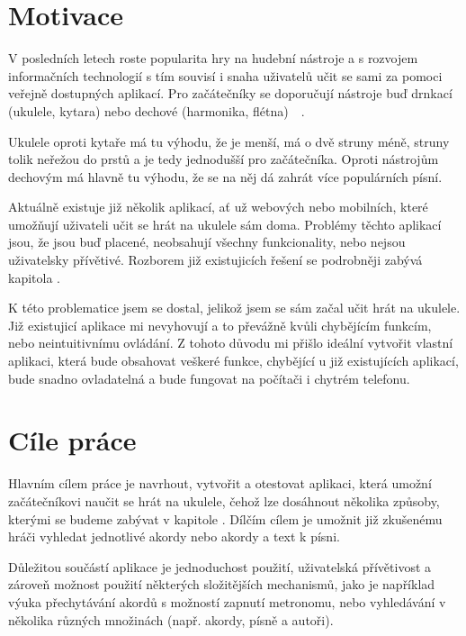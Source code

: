 \begin{introduction}
    \label{ch:introduction}
    \section{Motivace}
    V posledních letech roste popularita hry na hudební nástroje a s rozvojem informačních technologií s tím souvisí i snaha uživatelů učit se sami za pomoci veřejně dostupných aplikací. Pro začátečníky se doporučují nástroje buď drnkací (ukulele, kytara) nebo dechové (harmonika, flétna)~\cite{s_2016_the}~\cite{richardson_2019_top}.

    Ukulele oproti kytaře má tu výhodu, že je menší, má o dvě struny méně, struny tolik neřežou do prstů a je tedy jednodušší pro začátečníka. Oproti nástrojům dechovým má hlavně tu výhodu, že se na něj dá zahrát více populárních písní.

    Aktuálně existuje již několik aplikací, ať už webových nebo mobilních, které umožňují uživateli učit se hrát na ukulele sám doma. Problémy těchto aplikací jsou, že jsou buď placené, neobsahují všechny funkcionality, nebo nejsou uživatelsky přívětivé. Rozborem již existujicích řešení se podrobněji zabývá kapitola .

    K této problematice jsem se dostal, jelikož jsem se sám začal učit hrát na ukulele. Již existujicí aplikace mi nevyhovují a to převážně kvůli chybějícím funkcím, nebo neintuitivnímu ovládání. Z tohoto důvodu mi přišlo ideální vytvořit vlastní aplikaci, která bude obsahovat veškeré funkce, chybějící u již existujících aplikací, bude snadno ovladatelná a bude fungovat na počítači i chytrém telefonu.


    \section{Cíle práce}
    Hlavním cílem práce je navrhout, vytvořit a otestovat aplikaci, která umožní začátečníkovi naučit se hrát na ukulele, čehož lze dosáhnout několika způsoby, kterými se budeme zabývat v kapitole . Dílčím cílem je umožnit již zkušenému hráči vyhledat jednotlivé akordy nebo akordy a text k písni.

    Důležitou součástí aplikace je jednoduchost použití, uživatelská přívětivost a zároveň možnost použití některých složitějších mechanismů, jako je například výuka přechytávání akordů s možností zapnutí metronomu, nebo vyhledávání v několika různých množinách (např. akordy, písně a autoři).


\end{introduction}
